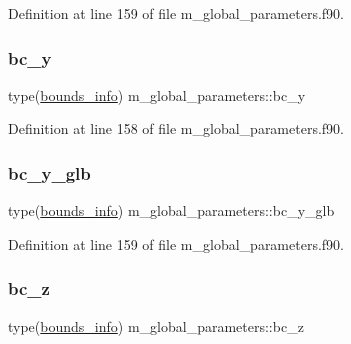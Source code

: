 Definition at line 159 of file m\+\_\+global\+\_\+parameters.\+f90.

\mbox{\label{namespacem__global__parameters_a68eaaca2982b39252417b29ef5d0f9c3}} 
\subsubsection{\texorpdfstring{bc\+\_\+y}{bc\_y}}
{\footnotesize\ttfamily type(\hyperlink{structm__derived__types_1_1bounds__info}{bounds\+\_\+info}) m\+\_\+global\+\_\+parameters\+::bc\+\_\+y}



Definition at line 158 of file m\+\_\+global\+\_\+parameters.\+f90.

\mbox{\label{namespacem__global__parameters_ac480f572058786c13c3e94efb6496a71}} 
\subsubsection{\texorpdfstring{bc\+\_\+y\+\_\+glb}{bc\_y\_glb}}
{\footnotesize\ttfamily type(\hyperlink{structm__derived__types_1_1bounds__info}{bounds\+\_\+info}) m\+\_\+global\+\_\+parameters\+::bc\+\_\+y\+\_\+glb}



Definition at line 159 of file m\+\_\+global\+\_\+parameters.\+f90.

\mbox{\label{namespacem__global__parameters_a6769808569174ff0eef096e958889837}} 
\subsubsection{\texorpdfstring{bc\+\_\+z}{bc\_z}}
{\footnotesize\ttfamily type(\hyperlink{structm__derived__types_1_1bounds__info}{bounds\+\_\+info}) m\+\_\+global\+\_\+parameters\+::bc\+\_\+z}



